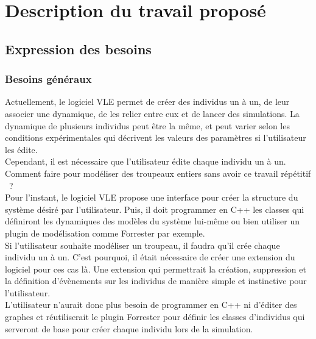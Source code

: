 \chapter{Description du travail proposé}
\setlength{\parskip}{2.5ex plus .4ex minus .4ex}

\section{Expression des besoins}
\subsection{Besoins généraux}
Actuellement, le logiciel VLE permet de créer des individus un à un, de leur associer une dynamique, de les relier entre eux et de lancer des simulations. La dynamique de plusieurs individus peut être la même, et peut varier selon les conditions expérimentales qui décrivent les valeurs des paramètres si l'utilisateur les édite.\\
Cependant, il est nécessaire que l'utilisateur édite chaque individu un à un. Comment faire pour modéliser des troupeaux entiers sans avoir ce travail répétitif ~?\\
Pour l'instant, le logiciel VLE propose une interface pour créer la structure du système désiré par l'utilisateur. Puis, il doit programmer en C++ les classes qui définiront les dynamiques des modèles du système lui-même ou bien utiliser un plugin de modélisation comme Forrester par exemple.\\
Si l'utilisateur souhaite modéliser un troupeau, il faudra qu'il crée chaque individu un à un. C'est pourquoi, il était nécessaire de créer une extension du logiciel pour ces cas là. Une extension qui permettrait la création, suppression et la définition d'évènements sur les individus de manière simple et instinctive pour l'utilisateur.\\
L'utilisateur n'aurait donc plus besoin de programmer en C++ ni d'éditer des graphes et réutiliserait le plugin Forrester pour définir les classes d'individus qui serveront de base pour créer chaque individu lors de la simulation.

